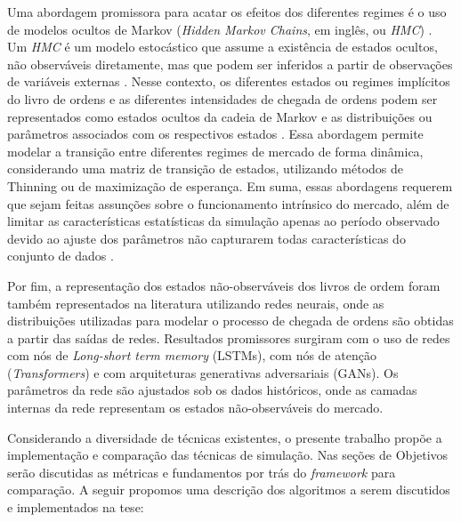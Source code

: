 Uma abordagem promissora para acatar os efeitos dos diferentes regimes é o uso de modelos ocultos de Markov (\textit{Hidden Markov Chains}, em inglês, ou \textit{HMC}) \citep{Cont2010}. Um \textit{HMC} é um modelo estocástico que assume a existência de estados ocultos, não observáveis diretamente, mas que podem ser inferidos a partir de observações de variáveis externas \citep{Baum1966}. Nesse contexto, os diferentes estados ou regimes implícitos do livro de ordens e as diferentes intensidades de chegada de ordens podem ser representados como estados ocultos da cadeia de Markov e as distribuições ou parâmetros associados com os respectivos estados \citep{MorariuPatrichi2022}. Essa abordagem permite modelar a transição entre diferentes regimes de mercado de forma dinâmica, considerando uma matriz de transição de estados, utilizando métodos de Thinning ou \citep{Ponta2012} de maximização de esperança. Em suma, essas abordagens requerem que sejam feitas assunções sobre o funcionamento intrínsico do mercado, além de limitar as características estatísticas da simulação apenas ao período observado devido ao ajuste dos parâmetros não capturarem todas características do conjunto de dados \citep{Zare2021}.

Por fim, a representação dos estados não-observáveis dos livros de ordem foram também representados na literatura utilizando redes neurais, onde as distribuições utilizadas para modelar o processo de chegada de ordens são obtidas a partir das saídas de redes. Resultados promissores surgiram com o uso de redes com nós de \textit{Long-short term memory} (LSTMs), com nós de atenção (\textit{Transformers}) e com arquiteturas generativas adversariais (GANs). Os parâmetros da rede são ajustados sob os dados históricos, onde as camadas internas da rede representam os estados não-observáveis do mercado. 

Considerando a diversidade de técnicas existentes, o presente trabalho propõe a implementação e comparação das técnicas de simulação. Nas seções de Objetivos serão discutidas as métricas e fundamentos por trás do \textit{framework} para comparação. A seguir propomos uma descrição dos algoritmos a serem discutidos e implementados na tese:

